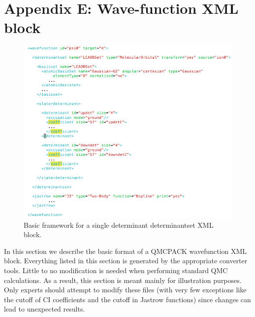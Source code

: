 \newpage
\section{Appendix E: Wave-function XML block}

\begin{figure}[ht!]
\begin{center}
\includegraphics[trim = 0mm 0mm 0mm 0mm, clip,width=1.0\columnwidth]{./figures/lab_advanced_molecules_xml_determinantset}
\end{center}
\caption{Basic framework for a single determinant determinantset XML block.
\label{fig:lam_xml_determinantset}
}
\end{figure}

In this section we describe the basic format of a QMCPACK wavefunction XML block.
Everything listed in this section is generated by the appropriate converter tools. Little to
no modification is needed when performing standard QMC calculations. As a result, this
section is meant mainly for illustration purposes. Only experts should attempt to modify
these files (with very few exceptions like the cutoff of CI coefficients and the cutoff in Jastrow
functions) since changes can lead to unexpected results.


